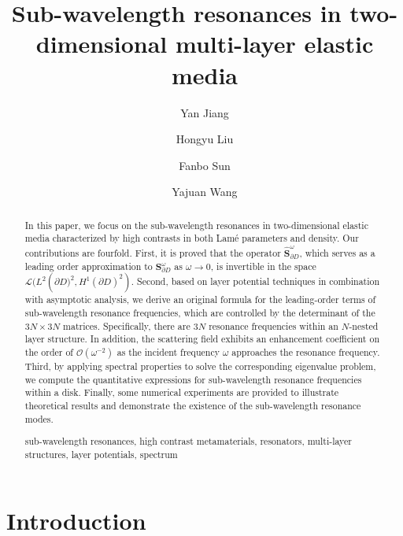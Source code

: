 \documentclass[10pt,reqno,oneside]{amsart}%
\title[Sub-wavelength resonances of
elastic waves in 2D]{Sub-wavelength resonances in two-dimensional multi-layer elastic media}
\author{Yan Jiang}
\author{Hongyu Liu}
\author{Fanbo Sun}
\author{Yajuan Wang}
\date{} %
\theoremstyle{definition}
\theoremstyle{remark}
\numberwithin{equation}{section}
\numberwithin{equation}{section}
\begin{document}
\maketitle

\begin{abstract}
In this paper, we focus on the sub-wavelength resonances in two-dimensional elastic media characterized by high contrasts in both Lam\'e parameters and density. Our contributions are fourfold. First, it is proved that the operator $\hat{\mathbf{S}}_{\partial D}^{\omega}$, which serves as a leading order approximation to $\mathbf{S}_{\partial D}^{\omega}$ as $\omega\rightarrow0$, is invertible in the space $\mathcal{L}(L^{2}\left(\partial D)^{2},H^{1}(\partial D)^{2}\right)$. Second, based on layer potential techniques in combination with asymptotic analysis, we derive an original formula for the leading-order terms of sub-wavelength resonance frequencies, which are controlled by the determinant of the $3N \times 3N$ matrices. Specifically, there are $3N$ resonance frequencies within an $N$-nested layer structure. In addition, the scattering field exhibits an enhancement coefficient on the order of $\mathcal{O}(\omega^{-2})$ as the incident frequency $\omega$ approaches the resonance frequency. Third, by applying spectral properties to solve the corresponding eigenvalue problem, we compute the quantitative expressions for sub-wavelength resonance frequencies within a disk. Finally, some numerical experiments are provided to illustrate theoretical results and demonstrate the existence of the sub-wavelength resonance modes.

\medskip

 sub-wavelength resonances, high contrast metamaterials, resonators, multi-layer structures, layer potentials, spectrum

\end{abstract}

\section{Introduction}
\end{document}
